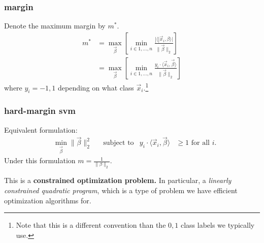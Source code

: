 \documentclass[handout,compress]{beamer}
\begin{document}
\begin{frame}
	\frametitle{margin}
	Denote the maximum margin by $m^*$. 
	\begin{align*}
	m^* &= \max_{\vec{\beta}} \left[\min_{i\in 1, \ldots, n} \frac{|\langle |\vec{x}_i, \beta\rangle|}{\|\vec{\beta}\|_2} \right]\\
	&= \max_{\vec{\beta}} \left[\min_{i\in 1, \ldots, n} \frac{y_i\cdot\langle \vec{x}_i, \vec{\beta}\rangle}{\|\vec{\beta}\|_2} \right]
	\end{align*}
	where $y_i = -1,1$ depending on what class $\vec{x}_i$.\footnote{Note that this is a different convention than the $0,1$ class labels we typically use.}
\end{frame}


\begin{frame}
	\frametitle{hard-margin svm}
	Equivalent formulation:
	\begin{align*}
	&\min_{\vec{\beta}} \|\vec{\beta}\|_2^2 & &\text{subject to}  & y_i\cdot\langle \vec{x}_i, \vec{\beta}\rangle &\geq 1 \text{ for all } i.
	\end{align*}
	Under this formulation $m = \frac{1}{\|\beta\|_2}$.
	\vspace{9em}
	
	
	This is a \textbf{constrained optimization problem.} In particular, a \emph{linearly constrained quadratic program}, which is a type of problem we have efficient optimization algorithms for. 
\end{frame}
\end{document}
